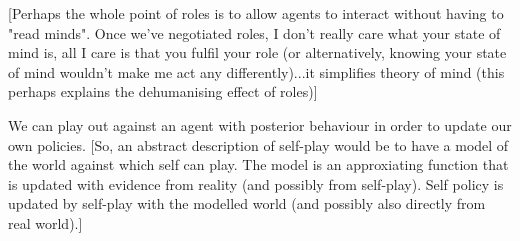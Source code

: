 \documentclass[a4paper]{report}
\begin{document}
[Perhaps the whole point of roles is to allow agents to interact without having to "read minds". Once we've negotiated roles, I don't really care what your state of mind is, all I care is that you fulfil your role (or alternatively, knowing your state of mind wouldn't make me act any differently)...it simplifies theory of mind (this perhaps explains the dehumanising effect of roles)]

We can play out against an agent with posterior behaviour in order to update our own policies. [So, an abstract description of self-play would be to have a model of the world against which self can play. The model is an approxiating function that is updated with evidence from reality (and possibly from self-play). Self policy is updated by self-play with the modelled world (and possibly also directly from real world).] 
\end{document}
